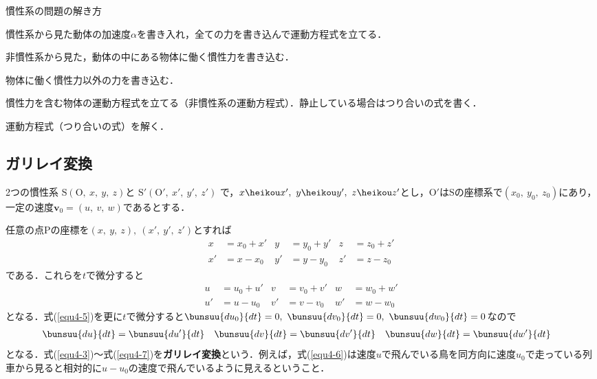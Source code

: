 慣性系の問題の解き方
\begin{enumerate}[label=\textbf{[\arabic*]}, labelsep=10pt, leftmargin=23pt]
	\item 慣性系から見た動体の加速度$\alpha$を書き入れ，全ての力を書き込んで運動方程式を立てる．
	\item 非慣性系から見た，動体の中にある物体に働く慣性力を書き込む．
	\item 物体に働く慣性力以外の力を書き込む．
	\item 慣性力を含む物体の運動方程式を立てる（非慣性系の運動方程式）．静止している場合はつり合いの式を書く．
	\item 運動方程式（つり合いの式）を解く．
\end{enumerate}



\subsection{ガリレイ変換}

2つの慣性系
$\mathrm{S}(\mathrm{O},\ x,\ y,\ z)$と
$\mathrm{S}'(\mathrm{O}',\ x',\ y',\ z')$
で，$x \heikou x',\ y \heikou y',\ z \heikou z'$とし，$\mathrm{O}'$は$\mathrm{S}$の座標系で$(x_0,\ y_0,\ z_0)$にあり，一定の速度$\bm{v}_0 = (u,\ v,\ w)$であるとする．

任意の点$\mathrm{P}$の座標を$(x,\ y,\ z),\ (x',\ y',\ z')$とすれば
\begin{align}
	x &= x_0 + x' & y &= y_0 + y' & z &= z_0 + z' \label{equ4-3}\\
	x' &= x - x_0 & y' &= y - y_0 & z' &= z - z_0 \label{equ4-4}
\end{align}
である．これらを$t$で微分すると
\begin{align}
	u &= u_0 + u' & v &= v_0 + v' & w &= w_0 + w' \label{equ4-5}\\
	u' &= u - u_0 & v' &= v - v_0 & w' &= w - w_0 \label{equ4-6}
\end{align}
となる．式(\ref{equ4-5})を更に$t$で微分すると$\bunsuu{du_0}{dt} = 0,\ \bunsuu{dv_0}{dt} = 0,\ \bunsuu{dw_0}{dt} = 0$なので
\begin{align}
	\bunsuu{du}{dt} &= \bunsuu{du'}{dt} &
	\bunsuu{dv}{dt} &= \bunsuu{dv'}{dt} &
	\bunsuu{dw}{dt} &= \bunsuu{dw'}{dt} \label{equ4-7}
\end{align}
となる．式(\ref{equ4-3})～式(\ref{equ4-7})を\textbf{ガリレイ変換}という．例えば，式(\ref{equ4-6})は速度$u$で飛んでいる鳥を同方向に速度$u_0$で走っている列車から見ると相対的に$u - u_0$の速度で飛んでいるように見えるということ．

